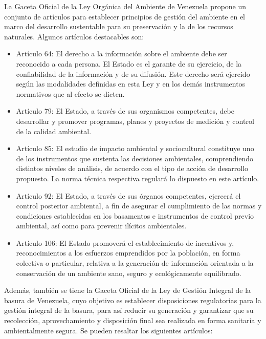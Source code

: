 La Gaceta Oficial de la Ley Orgánica del Ambiente de Venezuela propone un conjunto de artículos para establecer principios de gestión del ambiente en el marco del desarrollo sustentable para su preservación y la de los recursos naturales. Algunos artículos destacables son:

\begin{itemize}
    \item Artículo 64: El derecho a la información sobre el ambiente debe ser reconocido a cada persona. El Estado es el garante de su ejercicio, de la confiabilidad de la información y de su difusión. Este derecho será ejercido según las modalidades definidas en esta Ley y en los demás instrumentos normativos que al efecto se dicten.
    
    \item Artículo 79: El Estado, a través de sus organismos competentes, debe desarrollar y promover programas, planes y proyectos de medición y control de la calidad ambiental.

    \item Artículo 85: El estudio de impacto ambiental y sociocultural constituye uno de los instrumentos que sustenta las decisiones ambientales, comprendiendo distintos niveles de análisis, de acuerdo con el tipo de acción de desarrollo propuesto. La norma técnica respectiva regulará lo dispuesto en este artículo.

    \item Artículo 92: El Estado, a través de sus órganos competentes, ejercerá el control posterior ambiental, a fin de asegurar el cumplimiento de las normas y condiciones establecidas en los basamentos e instrumentos de control previo ambiental, así como para prevenir ilícitos ambientales.

    \item Artículo 106: El Estado promoverá el establecimiento de incentivos y, reconocimientos a los esfuerzos emprendidos por la población, en forma colectiva o particular, relativa a la generación de información orientada a la conservación de un ambiente sano, seguro y ecológicamente equilibrado.
\end{itemize}

Además, también se tiene la Gaceta Oficial de la Ley de Gestión Integral de la basura de Venezuela, cuyo objetivo es establecer disposiciones regulatorias para la gestión integral de la basura, para así reducir su generación y garantizar que su recolección, aprovechamiento y disposición final sea realizada en forma sanitaria y ambientalmente segura. Se pueden resaltar los siguientes artículos:

